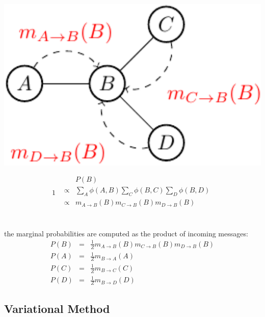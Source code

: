 \begin{minipage}[c]{0.4\textwidth}
      \centering
      \includegraphics[width=1.1\textwidth]{./Figures/message_passing_3}
\end{minipage}
\begin{minipage}[c]{0.6\textwidth}
 \begin{equation*}1
  \begin{array}{rcl}
  & & P(B) \\
  &\propto& \sum_{A}\phi(A,B) \sum_C \phi(B,C) \sum_D \phi(B,D)\\  
  &\propto& m_{A\rightarrow B}(B) m_{C\rightarrow B} (B) m_{D\rightarrow B}(B)  \\
  \end{array}
 \end{equation*}
\end{minipage}\\

 the marginal probabilities are computed as the product of incoming messages:
  \begin{equation*}
  \begin{array}{rcl}
   P(B)&=&\frac{1}{Z}m_{A\rightarrow B}(B) m_{C\rightarrow B} (B) m_{D\rightarrow B}(B)\\
   P(A)&=&\frac{1}{Z}m_{B\rightarrow A}(A) \\
   P(C)&=&\frac{1}{Z}m_{B\rightarrow C}(C) \\
   P(D)&=&\frac{1}{Z}m_{B\rightarrow D}(D) 
  \end{array}
 \end{equation*}


\subsection{Variational Method}


